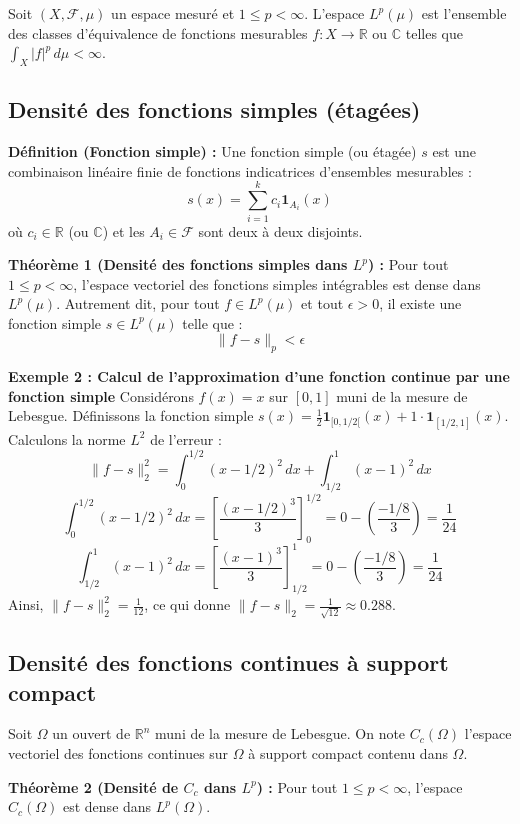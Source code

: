 \documentclass[11pt,a4paper]{article}
\begin{document}
Soit $(X, \mathcal{F}, \mu)$ un espace mesuré et $1 \le p < \infty$. L'espace $L^p(\mu)$ est l'ensemble des classes d'équivalence de fonctions mesurables $f : X \to \mathbb{R}$ ou $\mathbb{C}$ telles que $\int_X |f|^p \, d\mu < \infty$.

\subsection{Densité des fonctions simples (étagées)}

\textbf{Définition (Fonction simple) :}
Une fonction simple (ou étagée) $s$ est une combinaison linéaire finie de fonctions indicatrices d'ensembles mesurables :
$$ s(x) = \sum_{i=1}^k c_i \mathbf{1}_{A_i}(x) $$
où $c_i \in \mathbb{R}$ (ou $\mathbb{C}$) et les $A_i \in \mathcal{F}$ sont deux à deux disjoints.

\textbf{Théorème 1 (Densité des fonctions simples dans $L^p$) :}
Pour tout $1 \le p < \infty$, l'espace vectoriel des fonctions simples intégrables est dense dans $L^p(\mu)$.
Autrement dit, pour tout $f \in L^p(\mu)$ et tout $\epsilon > 0$, il existe une fonction simple $s \in L^p(\mu)$ telle que :
$$ \| f - s \|_p < \epsilon $$

\textbf{Exemple 2 : Calcul de l'approximation d'une fonction continue par une fonction simple}
Considérons $f(x) = x$ sur $[0,1]$ muni de la mesure de Lebesgue.
Définissons la fonction simple $s(x) = \frac{1}{2} \mathbf{1}_{[0, 1/2[}(x) + 1 \cdot \mathbf{1}_{[1/2, 1]}(x)$.
Calculons la norme $L^2$ de l'erreur :
$$ \| f - s \|_2^2 = \int_0^{1/2} (x - 1/2)^2 \, dx + \int_{1/2}^1 (x - 1)^2 \, dx $$
$$ \int_0^{1/2} (x - 1/2)^2 \, dx = \left[ \frac{(x-1/2)^3}{3} \right]_0^{1/2} = 0 - \left(\frac{-1/8}{3}\right) = \frac{1}{24} $$
$$ \int_{1/2}^1 (x - 1)^2 \, dx = \left[ \frac{(x-1)^3}{3} \right]_{1/2}^1 = 0 - \left(\frac{-1/8}{3}\right) = \frac{1}{24} $$
Ainsi, $\| f - s \|_2^2 = \frac{1}{12}$, ce qui donne $\| f - s \|_2 = \frac{1}{\sqrt{12}} \approx 0.288$.

\subsection{Densité des fonctions continues à support compact}

Soit $\Omega$ un ouvert de $\mathbb{R}^n$ muni de la mesure de Lebesgue. On note $C_c(\Omega)$ l'espace vectoriel des fonctions continues sur $\Omega$ à support compact contenu dans $\Omega$.

\textbf{Théorème 2 (Densité de $C_c$ dans $L^p$) :}
Pour tout $1 \le p < \infty$, l'espace $C_c(\Omega)$ est dense dans $L^p(\Omega)$.
\end{document}
